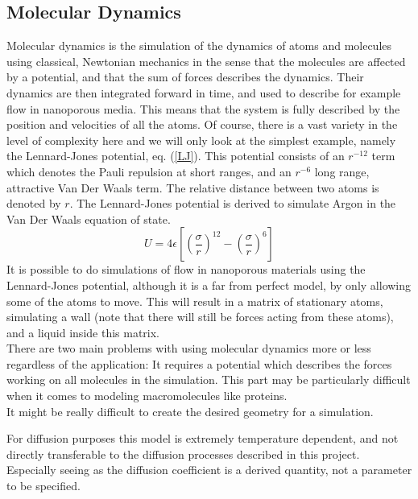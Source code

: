 \subsection{Molecular Dynamics}
Molecular dynamics is the simulation of the dynamics of atoms and molecules using classical, Newtonian mechanics in the sense that the molecules are affected by a potential, and that the sum of forces describes the dynamics. 
Their dynamics are then integrated forward in time, and used to describe for example flow in nanoporous media. 
This means that the system is fully described by the position and velocities of all the atoms. 
Of course, there is a vast variety in the level of complexity here and we will only look at the simplest example, namely the Lennard-Jones potential, eq. (\ref{LJ}). 
This potential consists of an $r^{-12}$ term which denotes the Pauli repulsion at short ranges, and an $r^{-6}$ long range, attractive Van Der Waals term. 
The relative distance between two atoms is denoted by $r$. 
The Lennard-Jones potential is derived to simulate Argon in the Van Der Waals equation of state.
\begin{equation}\label{LJ}
 U = 4\epsilon\left[\left(\frac{\sigma}{r}\right)^{12}-\left(\frac{\sigma}{r}\right)^{6}\right]
\end{equation}
It is possible to do simulations of flow in nanoporous materials using the Lennard-Jones potential, although it is a far from perfect model, by only allowing some of the atoms to move. 
This will result in a matrix of stationary atoms, simulating a wall (note that there will still be forces acting from these atoms), and a liquid inside this matrix. \\

There are two main problems with using molecular dynamics more or less regardless of the application: 
It requires a potential which describes the forces working on all molecules in the simulation. 
This part may be particularly difficult when it comes to modeling macromolecules like proteins.\\
It might be really difficult to create the desired geometry for a simulation. 

For diffusion purposes this model is extremely temperature dependent, and not directly transferable to the diffusion processes described in this project. 
Especially seeing as the diffusion coefficient is a derived quantity, not a parameter to be specified.

